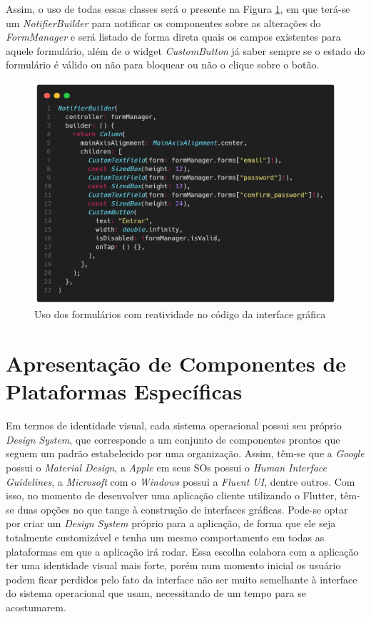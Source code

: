 \documentclass[12pt, %
openright, 
oneside, %
a4paper,    %
brazil]{facom-ufu-abntex2}
\begin{document}
Assim, o uso de todas essas classes será o presente na Figura \ref{fig:use_of_form_proposal}, em que terá-se um \textit{NotifierBuilder} para notificar os componentes sobre as alterações do \textit{FormManager} e será listado de forma direta quais os campos existentes para aquele formulário, além de o widget \textit{CustomButton} já saber sempre se o estado do formulário é válido ou não para bloquear ou não o clique sobre o botão.

\begin{figure}[ht]
    \centering
    \includegraphics[width=.65\textwidth, trim={0 30 0 100}, clip]{figures/forms/use_of_form_proposal.png}
    \caption{Uso dos formulários com reatividade no código da interface gráfica}
    \label{fig:use_of_form_proposal}
\end{figure}


\section{Apresentação de Componentes de Plataformas Específicas} \label{sec:plaform_components}

Em termos de identidade visual, cada sistema operacional possui seu próprio \textit{Design System}, que corresponde a um conjunto de componentes prontos que seguem um padrão estabelecido por uma organização. Assim, têm-se que a \textit{Google} possui o \textit{Material Design}, a \textit{Apple} em seus SOs possui o \textit{Human Interface Guidelines}, a \textit{Microsoft} com o \textit{Windows} possui a \textit{Fluent UI}, dentre outros. Com isso, no momento de desenvolver uma aplicação cliente utilizando o Flutter, têm-se duas opções no que tange à construção de interfaces gráficas. Pode-se optar por criar um \textit{Design System} próprio para a aplicação, de forma que ele seja totalmente customizável e tenha um mesmo comportamento em todas as plataformas em que a aplicação irá rodar. Essa escolha colabora com a aplicação ter uma identidade visual mais forte, porém num momento inicial os usuário podem ficar perdidos pelo fato da interface não ser muito semelhante à interface do sistema operacional que usam, necessitando de um tempo para se acostumarem.
\end{document}

